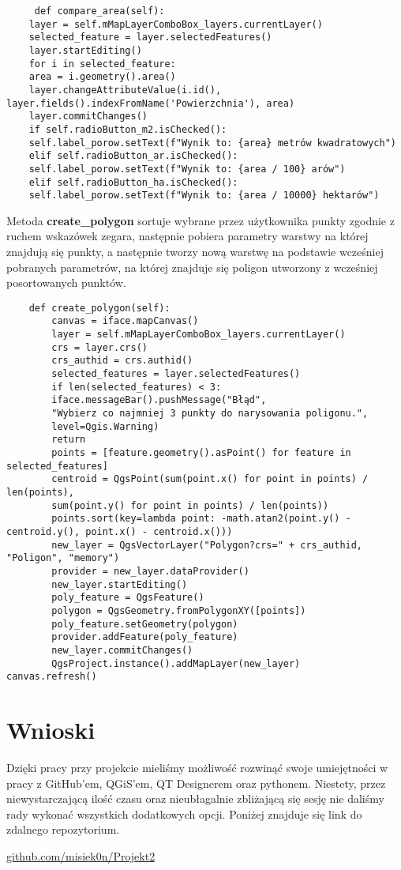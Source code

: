 \documentclass[a4paper,titleauthor]{mwart}
\begin{document}
\begin{verbatim}
	 def compare_area(self):
	layer = self.mMapLayerComboBox_layers.currentLayer()
	selected_feature = layer.selectedFeatures()
	layer.startEditing()
	for i in selected_feature:
	area = i.geometry().area()
	layer.changeAttributeValue(i.id(), layer.fields().indexFromName('Powierzchnia'), area)
	layer.commitChanges()
	if self.radioButton_m2.isChecked():
	self.label_porow.setText(f"Wynik to: {area} metrów kwadratowych")
	elif self.radioButton_ar.isChecked():
	self.label_porow.setText(f"Wynik to: {area / 100} arów")
	elif self.radioButton_ha.isChecked():
	self.label_porow.setText(f"Wynik to: {area / 10000} hektarów")
\end{verbatim}

Metoda \textbf{create\_polygon} sortuje wybrane przez użytkownika punkty zgodnie z ruchem wskazówek zegara, następnie pobiera parametry warstwy na której znajdują się punkty, a następnie tworzy nową warstwę na podstawie wcześniej pobranych parametrów, na której znajduje się poligon utworzony z wcześniej posortowanych punktów.

\begin{verbatim}
    def create_polygon(self):
		canvas = iface.mapCanvas()
		layer = self.mMapLayerComboBox_layers.currentLayer()
		crs = layer.crs()
		crs_authid = crs.authid()
		selected_features = layer.selectedFeatures()
		if len(selected_features) < 3:
		iface.messageBar().pushMessage("Błąd",
		"Wybierz co najmniej 3 punkty do narysowania poligonu.",
		level=Qgis.Warning)
		return
		points = [feature.geometry().asPoint() for feature in selected_features]
		centroid = QgsPoint(sum(point.x() for point in points) / len(points),
		sum(point.y() for point in points) / len(points))
		points.sort(key=lambda point: -math.atan2(point.y() - centroid.y(), point.x() - centroid.x()))
		new_layer = QgsVectorLayer("Polygon?crs=" + crs_authid, "Poligon", "memory")
		provider = new_layer.dataProvider()
		new_layer.startEditing()
		poly_feature = QgsFeature()
		polygon = QgsGeometry.fromPolygonXY([points])
		poly_feature.setGeometry(polygon)
		provider.addFeature(poly_feature)
		new_layer.commitChanges()
		QgsProject.instance().addMapLayer(new_layer)
canvas.refresh()
\end{verbatim}

\section{Wnioski}
Dzięki pracy przy projekcie mieliśmy możliwość rozwinąć swoje umiejętności w pracy z GitHub'em, QGiS'em, QT Designerem oraz pythonem. Niestety, przez niewystarczającą ilość czasu oraz nieubłagalnie zbliżającą się sesję nie daliśmy rady wykonać wszystkich dodatkowych opcji. Poniżej znajduje się link do zdalnego repozytorium.
\vspace{4cm}
\begin{center}
	\href{https://github.com/misiek0n/Projekt2}{github.com/misiek0n/Projekt2}
\end{center}
\end{document}

